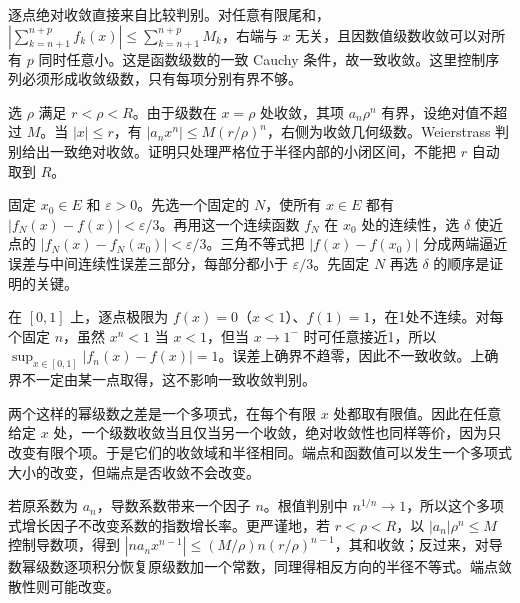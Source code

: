 \documentclass[12pt,fontset=fandol]{ctexart}
\begin{document}
\begin{solve}\label{ans:c29q11}
逐点绝对收敛直接来自比较判别。对任意有限尾和，$|\sum_{k=n+1}^{n+p}f_k(x)|\le\sum_{k=n+1}^{n+p}M_k$，右端与 $x$ 无关，且因数值级数收敛可以对所有 $p$ 同时任意小。这是函数级数的一致 Cauchy 条件，故一致收敛。这里控制序列必须形成收敛级数，只有每项分别有界不够。
\end{solve}

\begin{solve}\label{ans:c29q12}
选 $\rho$ 满足 $r<\rho<R$。由于级数在 $x=\rho$ 处收敛，其项 $a_n\rho^n$ 有界，设绝对值不超过 $M$。当 $|x|\le r$，有 $|a_nx^n|\le M(r/\rho)^n$，右侧为收敛几何级数。Weierstrass 判别给出一致绝对收敛。证明只处理严格位于半径内部的小闭区间，不能把 $r$ 自动取到 $R$。
\end{solve}

\begin{solve}\label{ans:c29q13}
固定 $x_0\in E$ 和 $\varepsilon>0$。先选一个固定的 $N$，使所有 $x\in E$ 都有 $|f_N(x)-f(x)|<\varepsilon/3$。再用这一个连续函数 $f_N$ 在 $x_0$ 处的连续性，选 $\delta$ 使近点的 $|f_N(x)-f_N(x_0)|<\varepsilon/3$。三角不等式把 $|f(x)-f(x_0)|$ 分成两端逼近误差与中间连续性误差三部分，每部分都小于 $\varepsilon/3$。先固定 $N$ 再选 $\delta$ 的顺序是证明的关键。
\end{solve}

\begin{solve}\label{ans:c29q14}
在 $[0,1]$ 上，逐点极限为 $f(x)=0$（$x<1$）、$f(1)=1$，在1处不连续。对每个固定 $n$，虽然 $x^n<1$ 当 $x<1$，但当 $x\to1^-$ 时可任意接近1，所以 $\sup_{x\in[0,1]}|f_n(x)-f(x)|=1$。误差上确界不趋零，因此不一致收敛。上确界不一定由某一点取得，这不影响一致收敛判别。
\end{solve}

\begin{solve}\label{ans:c29q15}
两个这样的幂级数之差是一个多项式，在每个有限 $x$ 处都取有限值。因此在任意给定 $x$ 处，一个级数收敛当且仅当另一个收敛，绝对收敛性也同样等价，因为只改变有限个项。于是它们的收敛域和半径相同。端点和函数值可以发生一个多项式大小的改变，但端点是否收敛不会改变。
\end{solve}

\begin{solve}\label{ans:c29q16}
若原系数为 $a_n$，导数系数带来一个因子 $n$。根值判别中 $n^{1/n}\to1$，所以这个多项式增长因子不改变系数的指数增长率。更严谨地，若 $r<\rho<R$，以 $|a_n|\rho^n\le M$ 控制导数项，得到 $|na_nx^{n-1}|\le(M/\rho)n(r/\rho)^{n-1}$，其和收敛；反过来，对导数幂级数逐项积分恢复原级数加一个常数，同理得相反方向的半径不等式。端点敛散性则可能改变。
\end{solve}
\end{document}

